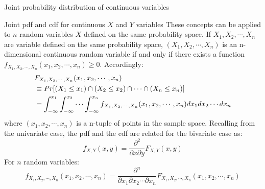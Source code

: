 \documentclass[8pt]{beamer}
\renewcommand{\emph}[1]{\textcolor{myorange}{#1}}
\begin{document}
\begin{frame}{Joint probability distribution of continuous variables}

    \begin{block}{Joint pdf and cdf for continuous $X$ and $Y$ variables}
        These concepts can be applied to $n$ random variables $X$ defined on the same probability space. If $X_1, X_2, \cdots, X_n$ are variable defined on the same probability space, $(X_1, X_2, \cdots, X_n)$ is an \alert{n-dimensional continuous random variable} if and only if there exists a function $f_{X_1, X_2, \cdots, X_n} (x_1, x_2, \cdots, x_n) \geq 0$. Accordingly:
        \begin{align*}
            \displaystyle
            &F_{X_1, X_2, \cdots, X_n} (x_1, x_2, \cdots, x_n) \\
            &\equiv Pr[( X_1 \leq x_1) \cap ( X_2 \leq x_2) \cap \cdots \cap ( X_n \leq x_n)] \\
            &= \int_{-\infty}^{x_1} \int_{-\infty}^{x_2} \cdots \int_{-\infty}^{x_n} f_{X_1, X_2, \cdots, X_n} (x_1, x_2, \cdots, x_n) dx_1 dx_2 \cdots dx_n
        \end{align*}
        where $(x_1, x_2, \cdots, x_n)$ is a \emph{n-tuple} of points in the sample space. 
        Recalling from the univariate case, the \emph{pdf} and the \emph{cdf} are related for the bivariate case as:
\[
            \displaystyle
            f_{X,Y} (x,y) = \frac{\partial^2 }{\partial x \partial y} F_{X,Y} (x,y)
        \]
        For $n$ random variables:
\[
            \displaystyle
             f_{X_1, X_2, \cdots, X_n} (x_1, x_2, \cdots, x_n) = \frac{\partial^n }{\partial x_1 \partial x_2  \cdots \partial x_n}F_{X_1, X_2, \cdots, X_n} (x_1, x_2, \cdots, x_n)
        \]

   \end{block}
\end{frame}
\end{document}
